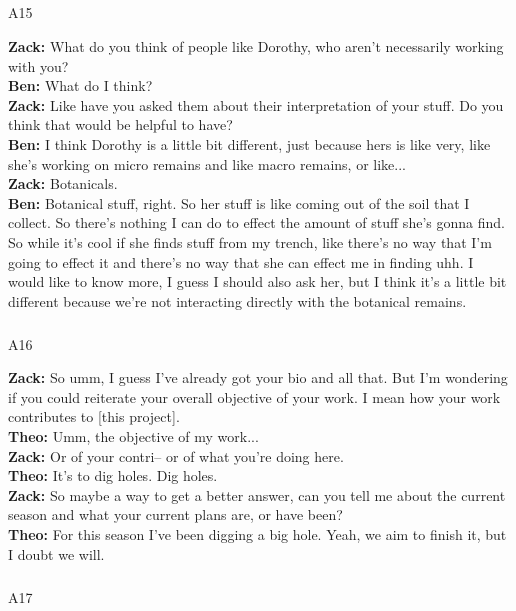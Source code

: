\documentclass[
]{article}
\makeatletter
\let\oldsubparagraph\subparagraph
\renewcommand{\subparagraph}{
    \@ifstar
      \xxxSubParagraphStar
      \xxxSubParagraphNoStar
  }
\newcommand{\xxxSubParagraphStar}[1]{\oldsubparagraph*{#1}\mbox{}}
\newcommand{\xxxSubParagraphNoStar}[1]{\oldsubparagraph{#1}\mbox{}}
\makeatother
\begin{document}
\subparagraph{A15}\label{sec-A15}

\textbf{Zack:} What do you think of people like Dorothy, who aren't
necessarily working with you?\\
\textbf{Ben:} What do I think?\\
\textbf{Zack:} Like have you asked them about their interpretation of
your stuff. Do you think that would be helpful to have?\\
\textbf{Ben:} I think Dorothy is a little bit different, just because
hers is like very, like she's working on micro remains and like macro
remains, or like...\\
\textbf{Zack:} Botanicals.\\
\textbf{Ben:} Botanical stuff, right. So her stuff is like coming out of
the soil that I collect. So there's nothing I can do to effect the
amount of stuff she's gonna find. So while it's cool if she finds stuff
from my trench, like there's no way that I'm going to effect it and
there's no way that she can effect me in finding uhh. I would like to
know more, I guess I should also ask her, but I think it's a little bit
different because we're not interacting directly with the botanical
remains.

\subparagraph{A16}\label{sec-A16}

\textbf{Zack:} So umm, I guess I've already got your bio and all that.
But I'm wondering if you could reiterate your overall objective of your
work. I mean how your work contributes to {[}this project{]}.\\
\textbf{Theo:} Umm, the objective of my work...\\
\textbf{Zack:} Or of your contri-- or of what you're doing here.\\
\textbf{Theo:} It's to dig holes. Dig holes.\\
\textbf{Zack:} So maybe a way to get a better answer, can you tell me
about the current season and what your current plans are, or have
been?\\
\textbf{Theo:} For this season I've been digging a big hole. Yeah, we
aim to finish it, but I doubt we will.

\subparagraph{A17}\label{sec-A17}
\end{document}
